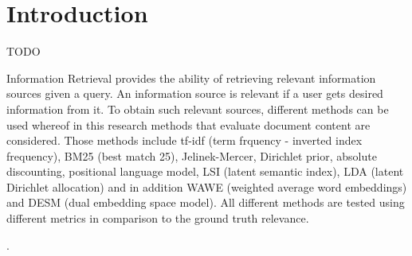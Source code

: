 \section{Introduction}

TODO

Information Retrieval provides the ability of retrieving relevant information sources given a query. An information source is relevant if a user gets desired information from it. To obtain such relevant sources, different methods can be used whereof in this research methods that evaluate document content are considered. Those methods include tf-idf (term frquency - inverted index frequency), BM25 (best match 25), Jelinek-Mercer, Dirichlet prior, absolute discounting, positional language model, LSI (latent semantic index), LDA (latent Dirichlet allocation) and in addition WAWE (weighted average word embeddings) and DESM (dual embedding space model). All different methods are tested using different metrics in comparison to the ground truth relevance.


\cite{Lamport:LaTeX}.
